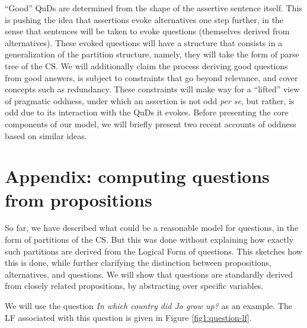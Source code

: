  ``Good'' QuDs are determined from the shape of the assertive sentence itself. This is pushing the idea that assertions evoke alternatives one step further, in the sense that sentences will be taken to evoke questions (themselves derived from alternatives). These evoked questions will have a structure that consists in a generalization of the partition structure, namely, they will take the form of parse tree of the CS. We will additionally claim the process deriving good questions from good answers, is subject to constraints that go beyond relevance, and cover concepts such as redundancy. These constraints will make way for a ``lifted'' view of pragmatic oddness, under which an assertion is not odd \textit{per se}, but rather, is odd due to its interaction with the QuDs it evokes. Before presenting the core components of our model, we will briefly present two recent accounts of oddness based on similar ideas.



%
%
%
%
% 



\section{Appendix: computing questions from propositions}\label{sec:q-derivation}

So far, we have described what could be a reasonable model for questions, in the form of partitions of the CS. But this was done without explaining how exactly such partitions are derived from the Logical Form of questions. This sketches how this is done, while further clarifying the distinction between propositions, alternatives, and questions. We will show that questions are standardly derived from closely related propositions, by abstracting over specific variables.

We will use the question \textit{In which country did Jo grow up?} as an example. The LF associated with this question is given in Figure \ref{fig1:question-lf}.

